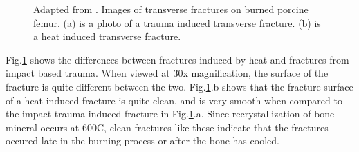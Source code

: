 \documentclass[titlepage]{article}
\begin{document}
\begin{figure}[h!]
\begin{subfigure}{.5\textwidth}
\end{subfigure}
\caption{Adapted from \cite{fire-bone}. Images of transverse fractures on burned porcine femur. (a) is a photo of a trauma induced transverse fracture. (b) is a heat induced transverse fracture.}
\label{fig:fracture_comp}
\end{figure}

Fig.\ref{fig:fracture_comp} shows the differences between fractures induced by heat and fractures from impact based trauma. When viewed at 30x magnification, the surface of the fracture is quite different between the two. Fig.\ref{fig:fracture_comp}.b shows that the fracture surface of a heat induced fracture is quite clean, and is very smooth when compared to the impact trauma induced fracture in Fig.\ref{fig:fracture_comp}.a. Since recrystallization of bone mineral occurs at 600C, clean fractures like these indicate that the fractures occured late in the burning process or after the bone has cooled.
\end{document}
